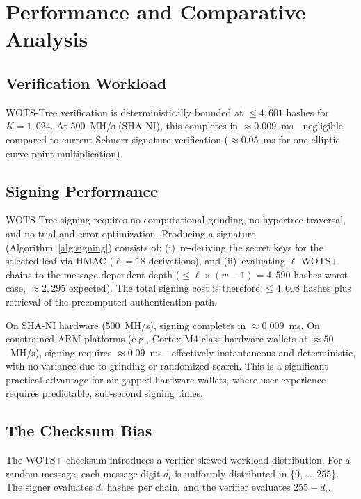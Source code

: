 \documentclass[11pt,a4paper]{article}
\theoremstyle{definition}
\begin{document}
\section{Performance and Comparative Analysis}
\label{sec:performance}

\subsection{Verification Workload}

WOTS-Tree verification is deterministically bounded at $\leq 4{,}601$ hashes for $K = 1{,}024$. At 500~MH/s (SHA-NI), this completes in $\approx 0.009$~ms---negligible compared to current Schnorr signature verification ($\approx 0.05$~ms for one elliptic curve point multiplication).

\subsection{Signing Performance}

WOTS-Tree signing requires no computational grinding, no hypertree traversal, and no trial-and-error optimization. Producing a signature (Algorithm~\ref{alg:signing}) consists of: (i)~re-deriving the secret keys for the selected leaf via HMAC ($\ell = 18$ derivations), and (ii)~evaluating $\ell$ WOTS+ chains to the message-dependent depth ($\leq \ell \times (w-1) = 4{,}590$ hashes worst case, $\approx 2{,}295$ expected). The total signing cost is therefore $\leq 4{,}608$ hashes plus retrieval of the precomputed authentication path.

On SHA-NI hardware (500~MH/s), signing completes in $\approx 0.009$~ms. On constrained ARM platforms (e.g., Cortex-M4 class hardware wallets at $\approx 50$~MH/s), signing requires $\approx 0.09$~ms---effectively instantaneous and deterministic, with no variance due to grinding or randomized search. This is a significant practical advantage for air-gapped hardware wallets, where user experience requires predictable, sub-second signing times.

\subsection{The Checksum Bias}
\label{sec:checksum-bias}

The WOTS+ checksum introduces a verifier-skewed workload distribution. For a random message, each message digit $d_i$ is uniformly distributed in $\{0, \ldots, 255\}$. The signer evaluates $d_i$ hashes per chain, and the verifier evaluates $255 - d_i$.
\end{document}
